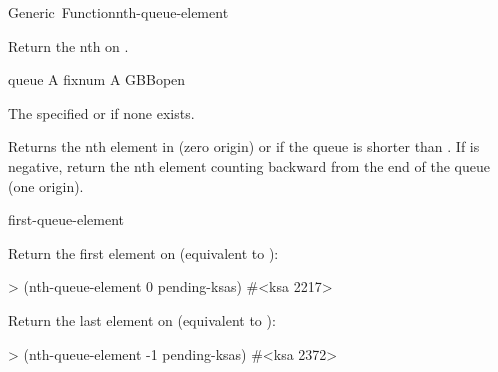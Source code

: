 \documentclass[10pt,twoside,english,pdftex]{article}
\begin{document}
\begin{functiondoc}{Generic~Function}{nth-queue-element}{ 
    \returns{} }
%

\fnsyntax

\fnpurpose Return the nth  on .

\fnmethods
{}

\fnpackage {}

\fnmodule {}

\fnargs
\begin{args}{queue}
\arg[n] A fixnum
\arg[queue] A GBBopen 
\end{args}

\fnreturns The specified  or \nil{} if none exists.
  
\fndescription Returns the nth element in  (zero origin) or
\nil{} if the queue is shorter than .  If  is negative,
return the nth element counting backward from the end of the queue (one
origin).

\begin{alsos}{first-queue-element}
\end{alsos}

%
%
\fnexamples
Return the first element on  (equivalent to
\textbf{}):
\begin{example}
> (nth-queue-element 0 pending-ksas)
#<ksa 2217>
\end{example}
Return the last element on  (equivalent to
\textbf{}):
\begin{example}
> (nth-queue-element -1 pending-ksas)
#<ksa 2372>
\end{example}

\end{functiondoc}

\end{document}

